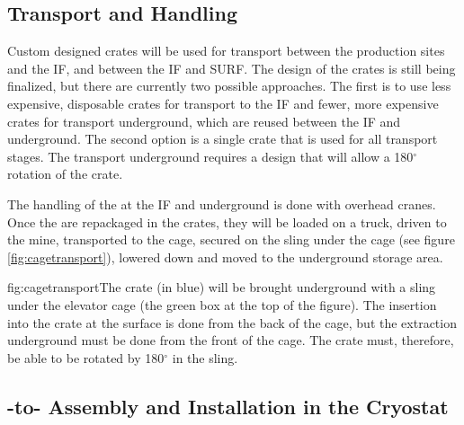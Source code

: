 \subsection{Transport and Handling}
\label{sec:fdsp-apa-install-transport}

Custom designed crates will be used for transport between the production sites and the IF, and between the IF and SURF. The design of the crates is still being finalized, but there are currently two possible approaches. The first is to use less expensive, disposable crates for transport to the IF and fewer, more expensive crates for transport underground, which are reused between the IF and underground. The second option is a single crate that is used for all transport stages. The transport underground requires a design that will allow a 180$^{\circ}$ rotation of the crate. 


The handling of the  at the IF and underground is done with overhead cranes. Once the  are repackaged in the crates, they  will be loaded on a truck, driven to the mine, transported to the cage, secured on the sling under the cage (see figure \ref{fig:cagetransport}), lowered down and moved to the underground storage area.

\begin{dunefigure}{fig:cagetransport}{The  crate (in blue) will be brought underground with a sling under the elevator cage (the green box at the top of the figure). The insertion into the crate at the surface is done from the back of the cage, but the extraction underground must be done from the front of the cage. The  crate must, therefore, be able to be rotated  by 180$^\circ$ in the sling.}
\setlength{\fboxsep}{0pt}
\setlength{\fboxrule}{0.5pt}
\end{dunefigure}


\subsection{-to- Assembly and Installation in the Cryostat}
\label{sec:fdsp-apa-install-cryostat}

